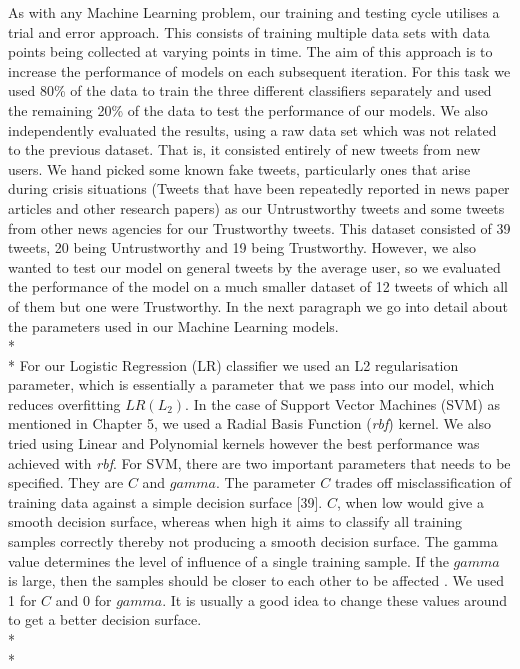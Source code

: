 As with any Machine Learning problem, our training and testing cycle utilises a trial and error approach. This consists of training multiple data sets with data points being collected at varying points in time. The aim of this approach is to increase the performance of models on each subsequent iteration. For this task we used 80\% of the data to train the three different classifiers separately and used the remaining 20\% of the data to test the performance of our models. We also independently evaluated the results, using a raw data set which was not related to the previous dataset. That is, it consisted entirely of new tweets from new users. We hand picked some known fake tweets, particularly ones that arise during crisis situations (Tweets that have been repeatedly reported in news paper articles and other research papers) as our Untrustworthy tweets and some tweets from other news agencies for our Trustworthy tweets. This dataset consisted of 39 tweets, 20 being Untrustworthy and 19 being Trustworthy. However, we also wanted to test our model on general tweets by the average user, so we evaluated the performance of the model on a much smaller dataset of 12 tweets of which all of them but one were Trustworthy. In the next paragraph we go into detail about the parameters used in our Machine Learning models.\\*\\*
For our Logistic Regression (LR) classifier we used an L2 regularisation parameter, which is essentially a parameter that we pass into our model, which reduces overfitting $LR(L_2)$. In the case of Support Vector Machines (SVM) as mentioned in Chapter 5, we used a Radial Basis Function (\textit{rbf}) kernel. We also tried using Linear and Polynomial kernels however the best performance was achieved with \textit{rbf}. For SVM, there are two important parameters that needs to be specified. They are $C$ and $gamma$. The parameter $C$ trades off misclassification of training data against a simple decision surface [39]. $C$, when low would give a smooth decision surface, whereas when high it aims to classify all training samples correctly thereby not producing a smooth decision surface. The gamma value determines the level of influence of a single training sample. If the $gamma$ is large, then the samples should be closer to each other to be affected \cite{39}. We used 1 for $C$ and 0 for $gamma$. It is usually a good idea to change these values around to get a better decision surface. \\*\\*

